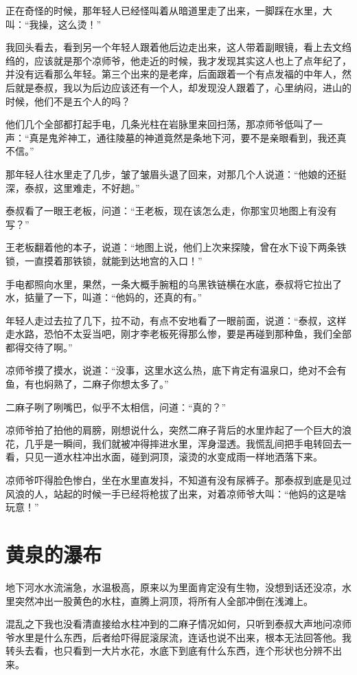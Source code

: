 正在奇怪的时候，那年轻人已经怪叫着从暗道里走了出来，一脚踩在水里，大叫：“我操，这么烫！”

我回头看去，看到另一个年轻人跟着他后边走出来，这人带着副眼镜，看上去文绉绉的，应该就是那个凉师爷，他走近的时候，我才发现其实这人也上了点年纪了，并没有远看那么年轻。第三个出来的是老痒，后面跟着一个有点发福的中年人，然后就是泰叔，我以为后边应该还有一个人，却发现没人跟着了，心里纳闷，进山的时候，他们不是五个人的吗？

他们几个全部都打起手电，几条光柱在岩脉里来回扫荡，那凉师爷低叫了一声：“真是鬼斧神工，通往陵墓的神道竟然是条地下河，要不是亲眼看到，我还真不信。”

那年轻人往水里走了几步，皱了皱眉头退了回来，对那几个人说道：“他娘的还挺深，泰叔，这里难走，不好趟。”

泰叔看了一眼王老板，问道：“王老板，现在该怎么走，你那宝贝地图上有没有写？”

王老板翻着他的本子，说道：“地图上说，他们上次来探陵，曾在水下设下两条铁锁，一直摸着那铁锁，就能到达地宫的入口！”

手电都照向水里，果然，一条大概手腕粗的乌黑铁链横在水底，泰叔将它拉出了水，掂量了一下，叫道：“他妈的，还真的有。”

年轻人走过去拉了几下，拉不动，有点不安地看了一眼前面，说道：“泰叔，这样走水路，恐怕不太妥当吧，刚才李老板死得那么惨，要是再碰到那种鱼，我们全部都得交待了啊。”

凉师爷摸了摸水，说道：“没事，这里水这么热，底下肯定有温泉口，绝对不会有鱼，有也焖熟了，二麻子你想太多了。”

二麻子咧了咧嘴巴，似乎不太相信，问道：“真的？”

凉师爷拍了拍他的肩膀，刚想说什么，突然二麻子背后的水里炸起了一个巨大的浪花，几乎是一瞬间，我们就被冲得摔进水里，浑身湿透。我慌乱间把手电转回去一看，只见一道水柱冲出水面，碰到洞顶，滚烫的水变成雨一样地洒落下来。

凉师爷吓得脸色惨白，坐在水里直发抖，不知道有没有尿裤子。那泰叔到底是见过风浪的人，站起的时候一手已经将枪拔了出来，对着凉师爷大叫：“他妈的这是啥玩意！”

\chapter{黄泉的瀑布}

地下河水水流湍急，水温极高，原来以为里面肯定没有生物，没想到话还没凉，水里突然冲出一股黄色的水柱，直腾上洞顶，将所有人全部冲倒在浅滩上。

混乱之下我也没看清直接给水柱冲到的二麻子情况如何，只听到泰叔大声地问凉师爷水里是什么东西，后者给吓得屁滚尿流，连话也说不出来，根本无法回答他。我转头去看，也只看到一大片水花，水底下到底有什么东西，连个形状也分辨不出来。


